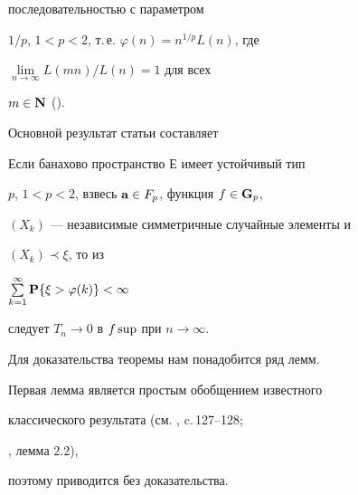 последовательностью с параметром


$1/p$, $1<p<2$, т.\,е. $\varphi (n)= n^{1/p} L(n)$, где


$\lim\limits_{n\to\infty} L(mn)/ L(n)= 1$ для всех


$m\in \bold N$ (\cite{Sen}).





Основной результат статьи составляет





\begin{thm} Если банахово пространство $Е$ имеет устойчивый тип


$p$, $1<p<2$, взвесь ${\bold a}\in F_{p} $, функция $f\in {\bold G}_{p}$,


$(X_{k})$ --- независимые симметричные случайные элементы и


$(X_{k} )\prec \xi $, то из


$\sum\limits^{\infty }_{k=1} \bold P \{\xi >\varphi (k)\}<\infty$


следует $T_{n} \to 0$ в $f\sup$ при $n\to \infty$.


\end{thm}





Для доказательства теоремы нам понадобится ряд лемм.


Первая лемма является простым обобщением известного


классического результата (см. \cite{Sto}, c.\,127--128;


\cite{Choi}, лемма 2.2),


поэтому приводится без доказательства.





